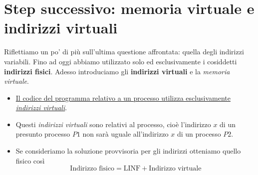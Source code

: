 \documentclass[11pt]{report}
\theoremstyle{definition}
\begin{document}
\section{Step successivo: memoria virtuale e indirizzi virtuali}
Riflettiamo un po' di più sull'ultima questione affrontata: quella degli indirizzi variabili. Fino ad oggi abbiamo utilizzato solo ed esclusivamente i cosiddetti \textbf{indirizzi fisici}. Adesso introduciamo gli \textbf{indirizzi virtuali} e la \emph{memoria virtuale}.
\begin{itemize}
	\item \underline{Il codice del programma relativo a un processo utilizza esclusivamente \emph{indirizzi virtuali}}.
	\item Questi \emph{indirizzi virtuali} sono relativi al processo, cioè l'indirizzo $x$ di un presunto processo $P1$ non sarà uguale all'indirizzo $x$ di un processo $P2$.
	\item Se consideriamo la soluzione provvisoria per gli indirizzi otteniamo quello fisico così
	\[\text{Indirizzo fisico}=\text{LINF}+\text{Indirizzo virtuale}\]
\end{itemize}
\end{document}

